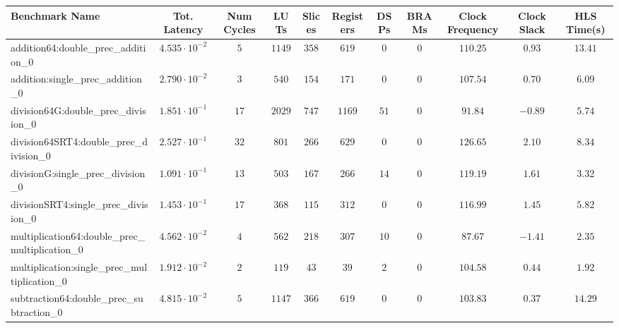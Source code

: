 \begin{tabular}{|l|c|c|c|c|c|c|c|c|c|c|}
\hline
Benchmark Name                                   & Tot. Latency            & Num Cycles & LUTs     & Slices   & Registers & DSPs   & BRAMs & Clock Frequency & Clock Slack & HLS Time(s) \\
\hline
addition64:double\_prec\_addition\_0             & $ 4.535 \cdot 10^{-2} $ & $ 5      $ & $ 1149 $ & $ 358  $ & $ 619   $ & $ 0  $ & $ 0 $ & $ 110.25      $ & $ 0.93    $ & $ 13.41   $ \\
addition:single\_prec\_addition\_0               & $ 2.790 \cdot 10^{-2} $ & $ 3      $ & $ 540  $ & $ 154  $ & $ 171   $ & $ 0  $ & $ 0 $ & $ 107.54      $ & $ 0.70    $ & $ 6.09    $ \\
division64G:double\_prec\_division\_0            & $ 1.851 \cdot 10^{-1} $ & $ 17     $ & $ 2029 $ & $ 747  $ & $ 1169  $ & $ 51 $ & $ 0 $ & $ 91.84       $ & $ -0.89   $ & $ 5.74    $ \\
division64SRT4:double\_prec\_division\_0         & $ 2.527 \cdot 10^{-1} $ & $ 32     $ & $ 801  $ & $ 266  $ & $ 629   $ & $ 0  $ & $ 0 $ & $ 126.65      $ & $ 2.10    $ & $ 8.34    $ \\
divisionG:single\_prec\_division\_0              & $ 1.091 \cdot 10^{-1} $ & $ 13     $ & $ 503  $ & $ 167  $ & $ 266   $ & $ 14 $ & $ 0 $ & $ 119.19      $ & $ 1.61    $ & $ 3.32    $ \\
divisionSRT4:single\_prec\_division\_0           & $ 1.453 \cdot 10^{-1} $ & $ 17     $ & $ 368  $ & $ 115  $ & $ 312   $ & $ 0  $ & $ 0 $ & $ 116.99      $ & $ 1.45    $ & $ 5.82    $ \\
multiplication64:double\_prec\_multiplication\_0 & $ 4.562 \cdot 10^{-2} $ & $ 4      $ & $ 562  $ & $ 218  $ & $ 307   $ & $ 10 $ & $ 0 $ & $ 87.67       $ & $ -1.41   $ & $ 2.35    $ \\
multiplication:single\_prec\_multiplication\_0   & $ 1.912 \cdot 10^{-2} $ & $ 2      $ & $ 119  $ & $ 43   $ & $ 39    $ & $ 2  $ & $ 0 $ & $ 104.58      $ & $ 0.44    $ & $ 1.92    $ \\
subtraction64:double\_prec\_subtraction\_0       & $ 4.815 \cdot 10^{-2} $ & $ 5      $ & $ 1147 $ & $ 366  $ & $ 619   $ & $ 0  $ & $ 0 $ & $ 103.83      $ & $ 0.37    $ & $ 14.29   $ \\

\end{tabular}
